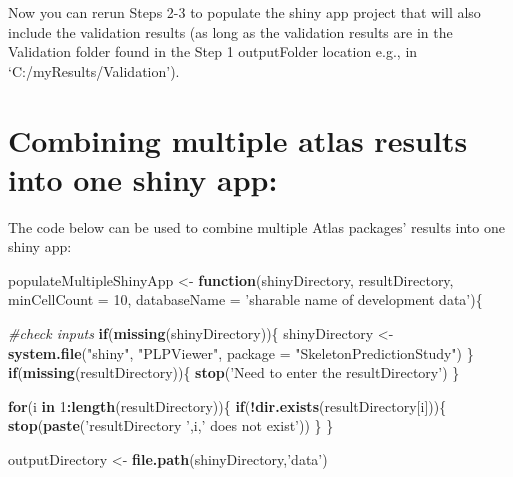 \documentclass[
]{article}
\newenvironment{Shaded}{\begin{snugshade}}{\end{snugshade}}
\newcommand{\CommentTok}[1]{\textcolor[rgb]{0.56,0.35,0.01}{\textit{#1}}}
\newcommand{\ControlFlowTok}[1]{\textcolor[rgb]{0.13,0.29,0.53}{\textbf{#1}}}
\newcommand{\DataTypeTok}[1]{\textcolor[rgb]{0.13,0.29,0.53}{#1}}
\newcommand{\DecValTok}[1]{\textcolor[rgb]{0.00,0.00,0.81}{#1}}
\newcommand{\KeywordTok}[1]{\textcolor[rgb]{0.13,0.29,0.53}{\textbf{#1}}}
\newcommand{\NormalTok}[1]{#1}
\newcommand{\OperatorTok}[1]{\textcolor[rgb]{0.81,0.36,0.00}{\textbf{#1}}}
\newcommand{\StringTok}[1]{\textcolor[rgb]{0.31,0.60,0.02}{#1}}
\begin{document}
Now you can rerun Steps 2-3 to populate the shiny app project that will
also include the validation results (as long as the validation results
are in the Validation folder found in the Step 1 outputFolder location
e.g., in `C:/myResults/Validation').

\hypertarget{combining-multiple-atlas-results-into-one-shiny-app}{%
\section{Combining multiple atlas results into one shiny
app:}\label{combining-multiple-atlas-results-into-one-shiny-app}}

The code below can be used to combine multiple Atlas packages' results
into one shiny app:

\begin{Shaded}
\begin{Highlighting}[]
\NormalTok{populateMultipleShinyApp <-}\StringTok{ }\ControlFlowTok{function}\NormalTok{(shinyDirectory,}
\NormalTok{                             resultDirectory,}
                             \DataTypeTok{minCellCount =} \DecValTok{10}\NormalTok{,}
                             \DataTypeTok{databaseName =} \StringTok{'sharable name of development data'}\NormalTok{)\{}
  
  \CommentTok{#check inputs}
  \ControlFlowTok{if}\NormalTok{(}\KeywordTok{missing}\NormalTok{(shinyDirectory))\{}
\NormalTok{    shinyDirectory <-}\StringTok{ }\KeywordTok{system.file}\NormalTok{(}\StringTok{"shiny"}\NormalTok{, }\StringTok{"PLPViewer"}\NormalTok{, }\DataTypeTok{package =} \StringTok{"SkeletonPredictionStudy"}\NormalTok{)}
\NormalTok{  \}}
  \ControlFlowTok{if}\NormalTok{(}\KeywordTok{missing}\NormalTok{(resultDirectory))\{}
    \KeywordTok{stop}\NormalTok{(}\StringTok{'Need to enter the resultDirectory'}\NormalTok{)}
\NormalTok{  \}}
  

    \ControlFlowTok{for}\NormalTok{(i }\ControlFlowTok{in} \DecValTok{1}\OperatorTok{:}\KeywordTok{length}\NormalTok{(resultDirectory))\{}
      \ControlFlowTok{if}\NormalTok{(}\OperatorTok{!}\KeywordTok{dir.exists}\NormalTok{(resultDirectory[i]))\{}
        \KeywordTok{stop}\NormalTok{(}\KeywordTok{paste}\NormalTok{(}\StringTok{'resultDirectory '}\NormalTok{,i,}\StringTok{' does not exist'}\NormalTok{))}
\NormalTok{      \}}
\NormalTok{    \}}
  
\NormalTok{  outputDirectory <-}\StringTok{ }\KeywordTok{file.path}\NormalTok{(shinyDirectory,}\StringTok{'data'}\NormalTok{)}
  

\end{Highlighting}
\end{Shaded}
\end{document}
